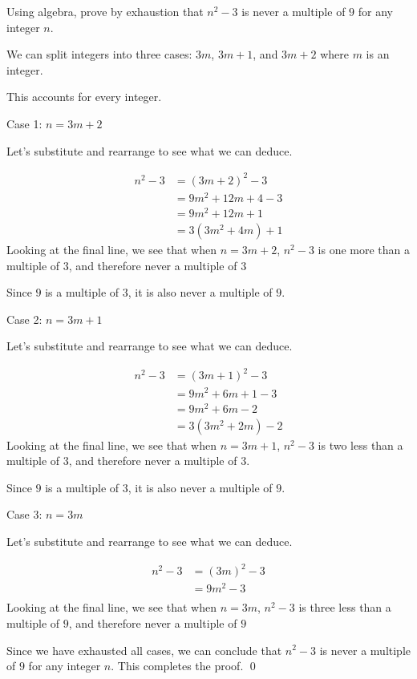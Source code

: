 \begin{example}
    Using algebra, prove by exhaustion that $n^2-3$ is never a multiple of $9$ for any integer $n$.
\end{example}
\begin{solution}
    We can split integers into three cases: $3m$, $3m+1$, and $3m+2$ where $m$ is an integer.

    This accounts for every integer.

    Case 1: $n= 3m+2$

    Let's substitute and rearrange to see what we can deduce.

    \begin{align*}
        n^2-3 &= (3m+2)^2 - 3 \tag{using $n= 3m+2$}\\
         &= 9m^2 + 12m + 4 - 3 \tag{expanding}\\
         &=  9m^2 + 12m +1 \\
         &= 3(3m^2 + 4m) +1
    \end{align*}
    Looking at the final line, we see that when $n= 3m+2$, $n^2-3$ is one more than a multiple of $3$, and therefore never a multiple of $3$

    Since $9$ is a multiple of $3$, it is also never a multiple of $9$.

    Case 2: $n= 3m+1$

    Let's substitute and rearrange to see what we can deduce.

    \begin{align*}
        n^2-3 &= (3m+1)^2 - 3 \tag{using $n= 3m+1$}\\
         &= 9m^2 + 6m + 1 - 3 \tag{expanding}\\
         &=  9m^2 + 6m -2 \\
         &= 3(3m^2 + 2m) -2
    \end{align*}
    Looking at the final line, we see that when $n= 3m+1$, $n^2-3$ is two less than a multiple of $3$, and therefore never a multiple of $3$.

    Since $9$ is a multiple of $3$, it is also never a multiple of $9$.

    Case 3: $n=3m$

    Let's substitute and rearrange to see what we can deduce.

    \begin{align*}
        n^2-3 &= (3m)^2 - 3 \tag{using $n= 3m$}\\
         &= 9m^2 - 3 \tag{expanding}\\
    \end{align*}
    Looking at the final line, we see that when $n= 3m$, $n^2-3$ is three less than a multiple of $9$, and therefore never a multiple of $9$

    Since we have exhausted all cases, we can conclude that $n^2-3$ is never a multiple of $9$ for any integer $n$. This completes the proof.
    \qed
\end{solution}

